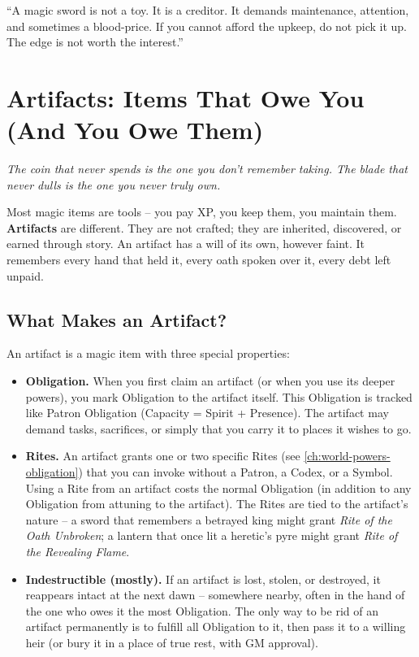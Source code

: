 \begin{tcolorbox}[colback=green!5!white,colframe=green!70!black,title=The Gray Wanderer's Tip,breakable]
``A magic sword is not a toy. It is a creditor. It demands maintenance, attention, and sometimes a blood-price. If you cannot afford the upkeep, do not pick it up. The edge is not worth the interest.''
\end{tcolorbox}

\section{Artifacts: Items That Owe You (And You Owe Them)}

\emph{The coin that never spends is the one you don't remember taking. The blade that never dulls is the one you never truly own.}

Most magic items are tools -- you pay XP, you keep them, you maintain them. \textbf{Artifacts} are different. They are not crafted; they are inherited, discovered, or earned through story. An artifact has a will of its own, however faint. It remembers every hand that held it, every oath spoken over it, every debt left unpaid.

\subsection{What Makes an Artifact?}

An artifact is a magic item with three special properties:

\begin{itemize}
  \item \textbf{Obligation.} When you first claim an artifact (or when you use its deeper powers), you mark Obligation to the artifact itself. This Obligation is tracked like Patron Obligation (Capacity = Spirit + Presence). The artifact may demand tasks, sacrifices, or simply that you carry it to places it wishes to go.
  \item \textbf{Rites.} An artifact grants one or two specific Rites (see \ref{ch:world-powers-obligation}) that you can invoke without a Patron, a Codex, or a Symbol. Using a Rite from an artifact costs the normal Obligation (in addition to any Obligation from attuning to the artifact). The Rites are tied to the artifact's nature -- a sword that remembers a betrayed king might grant \textit{Rite of the Oath Unbroken}; a lantern that once lit a heretic's pyre might grant \textit{Rite of the Revealing Flame}.
  \item \textbf{Indestructible (mostly).} If an artifact is lost, stolen, or destroyed, it reappears intact at the next dawn -- somewhere nearby, often in the hand of the one who owes it the most Obligation. The only way to be rid of an artifact permanently is to fulfill all Obligation to it, then pass it to a willing heir (or bury it in a place of true rest, with GM approval).
\end{itemize}

